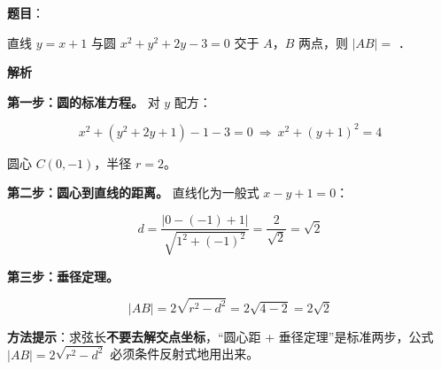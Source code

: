 \begin{answer}

\textbf{题目}：

直线 $y=x+1$ 与圆 $x^{2}+y^{2}+2y-3=0$ 交于 $A$，$B$ 两点，则 $|AB|=$ \gkblank{}．

\textbf{解析}

\textbf{第一步：圆的标准方程。} 对 $y$ 配方：

\nopagebreak[4]
\[x^{2}+\left(y^{2}+2y+1\right)-1-3=0\ \Longrightarrow\ x^{2}+(y+1)^{2}=4\]

圆心 $C(0,-1)$，半径 $r=2$。

\textbf{第二步：圆心到直线的距离。} 直线化为一般式 $x-y+1=0$：

\nopagebreak[4]
\[d=\frac{|0-(-1)+1|}{\sqrt{1^{2}+(-1)^{2}}}=\frac2{\sqrt2}=\sqrt2\]

\textbf{第三步：垂径定理。}

\nopagebreak[4]
\[|AB|=2\sqrt{r^{2}-d^{2}}=2\sqrt{4-2}=2\sqrt2\]

\begin{gktip}
\textbf{方法提示}：求弦长\textbf{不要去解交点坐标}，“圆心距 + 垂径定理”是标准两步，公式 $|AB|=2\sqrt{r^{2}-d^{2}}$ 必须条件反射式地用出来。
\end{gktip}


\par\medskip

\end{answer}
